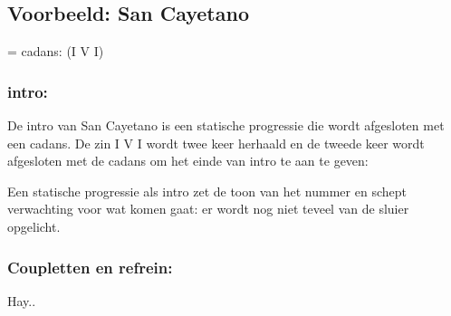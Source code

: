 \clearpage
\subsection*{Voorbeeld: San Cayetano}

 = cadans:    (I V I)

\subsubsection*{intro:}
De intro van San Cayetano is een statische progressie die wordt afgesloten met een cadans. De zin I V   I wordt twee keer herhaald en de tweede keer wordt afgesloten met de cadans om het einde van intro te aan te geven: 

\begin{instrumental}{}
							
		\measure{}				\measure{}	
		\measure{}				\measure{}	
\end{instrumental}

Een statische progressie als intro zet de toon van het nummer en schept verwachting voor wat komen gaat: er wordt nog niet teveel van de sluier opgelicht. 

\subsubsection*{Coupletten en refrein:}

\begin{instrumental}{}
							
	\measure{}	\measure{}			\measure{}	\measure{}	
	\measure{}	\measure{}			\measure{}	\measure{}	
\end{instrumental}

\vspace{-10pt}Hay..
\vspace{-10pt}
\begin{instrumental}{}
       
	\measure{}						
\end{instrumental}

